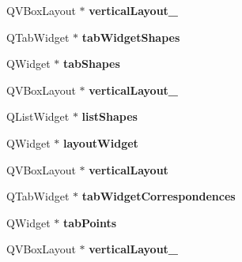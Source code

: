 \begin{DoxyCompactItemize}
\item 
\hypertarget{class_ui___shape_analyzer_a93bba68fe6f28676a1cc609394f62e54}{}Q\+V\+Box\+Layout $\ast$ {\bfseries vertical\+Layout\+\_}\label{class_ui___shape_analyzer_a93bba68fe6f28676a1cc609394f62e54}

\item 
\hypertarget{class_ui___shape_analyzer_a284153dd361af84c40b2facc16762f58}{}Q\+Tab\+Widget $\ast$ {\bfseries tab\+Widget\+Shapes}\label{class_ui___shape_analyzer_a284153dd361af84c40b2facc16762f58}

\item 
\hypertarget{class_ui___shape_analyzer_a672715620037c111d25a7196c0a14749}{}Q\+Widget $\ast$ {\bfseries tab\+Shapes}\label{class_ui___shape_analyzer_a672715620037c111d25a7196c0a14749}

\item 
\hypertarget{class_ui___shape_analyzer_a7e534c0d8db6cae11a8f3bf5d0661078}{}Q\+V\+Box\+Layout $\ast$ {\bfseries vertical\+Layout\+\_}\label{class_ui___shape_analyzer_a7e534c0d8db6cae11a8f3bf5d0661078}

\item 
\hypertarget{class_ui___shape_analyzer_a205a4e7eb5af9efefd8487b0637e466d}{}Q\+List\+Widget $\ast$ {\bfseries list\+Shapes}\label{class_ui___shape_analyzer_a205a4e7eb5af9efefd8487b0637e466d}

\item 
\hypertarget{class_ui___shape_analyzer_abe991d2842022b3fbf870d0ba22f4a15}{}Q\+Widget $\ast$ {\bfseries layout\+Widget}\label{class_ui___shape_analyzer_abe991d2842022b3fbf870d0ba22f4a15}

\item 
\hypertarget{class_ui___shape_analyzer_ad0822aa6aac4b49fcda8b58a361e914d}{}Q\+V\+Box\+Layout $\ast$ {\bfseries vertical\+Layout}\label{class_ui___shape_analyzer_ad0822aa6aac4b49fcda8b58a361e914d}

\item 
\hypertarget{class_ui___shape_analyzer_a10e9d48195813646bfbc5ffb85bded29}{}Q\+Tab\+Widget $\ast$ {\bfseries tab\+Widget\+Correspondences}\label{class_ui___shape_analyzer_a10e9d48195813646bfbc5ffb85bded29}

\item 
\hypertarget{class_ui___shape_analyzer_a7226f161411002b5b5d8422f75db436c}{}Q\+Widget $\ast$ {\bfseries tab\+Points}\label{class_ui___shape_analyzer_a7226f161411002b5b5d8422f75db436c}

\item 
\hypertarget{class_ui___shape_analyzer_a71511fcf6b99d07cf2bdcfcfa7ac6393}{}Q\+V\+Box\+Layout $\ast$ {\bfseries vertical\+Layout\+\_}\label{class_ui___shape_analyzer_a71511fcf6b99d07cf2bdcfcfa7ac6393}


\end{DoxyCompactItemize}
